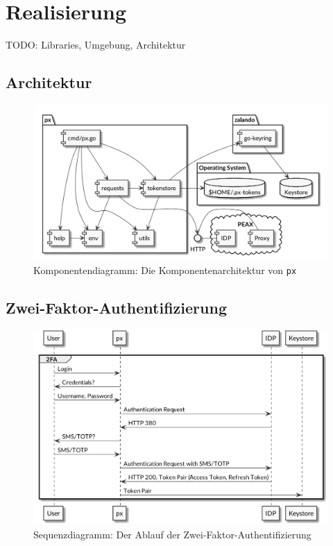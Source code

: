 \section{Realisierung}
\label{sec:Realisierung}

TODO: Libraries, Umgebung, Architektur

\subsection{Architektur}
\begin{figure}
    \centering
    \includegraphics[width=\linewidth]{pics/komponentendiagramm.png}
    \caption{Komponentendiagramm: Die Komponentenarchitektur von \texttt{px}}
\end{figure}

\subsection{Zwei-Faktor-Authentifizierung}

\begin{figure}
    \centering
    \includegraphics[width=\linewidth]{pics/sequence-2fa.png}
    \caption{Sequenzdiagramm: Der Ablauf der Zwei-Faktor-Authentifizierung}
\end{figure}

